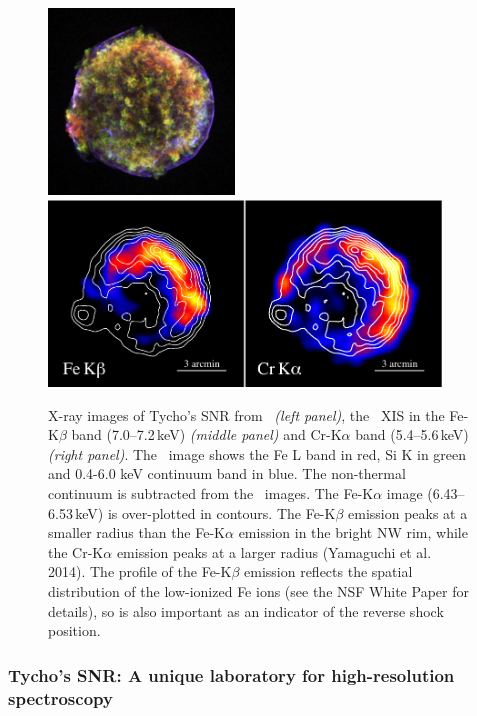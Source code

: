 \documentclass[11pt,a4paper]{article}
\begin{document}
\begin{figure}[ht]
  \begin{center}
   \includegraphics[height=1.95in]{tycho_chandra_v2.pdf}
     \includegraphics[height=1.95in]{image_tycho_suzaku}
  \caption{X-ray images of Tycho's SNR from \chandra\ {\it (left
      panel)}, the \suzaku\ XIS in the Fe-K$\beta$ band
    (7.0--7.2\,keV) {\it (middle panel)} and Cr-K$\alpha$ band
    (5.4--5.6\,keV) {\it (right panel)}. The \chandra\ image shows the
    Fe L band in red, Si K in green and 0.4-6.0 keV continuum band in
    blue. The non-thermal continuum is subtracted from the
    \suzaku\ images. The Fe-K$\alpha$ image (6.43--6.53\,keV) is
    over-plotted in contours.  The Fe-K$\beta$ emission peaks at a
    smaller radius than the Fe-K$\alpha$ emission in the bright NW
    rim, while the Cr-K$\alpha$ emission peaks at a larger radius (Yamaguchi et al. 2014).  
    The profile of the
    Fe-K$\beta$ emission reflects the spatial distribution of the
    low-ionized Fe ions (see the NSF White Paper for details), so is also
    important as an indicator of the reverse shock position.  }
  \label{tycho:suzaku}
  \end{center}
\end{figure}

\subsubsection{Tycho's SNR: A unique laboratory for high-resolution spectroscopy} \label{subsec:tycho}
\end{document}
